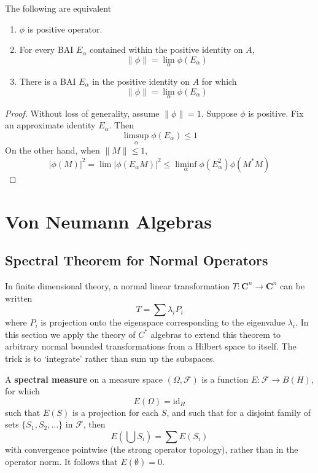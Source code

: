 \begin{theorem}
    The following are equivalent
    \begin{enumerate}
        \item $\phi$ is positive operator.
        \item For every BAI $E_\alpha$ contained within the positive identity on $A$,
        \[ \| \phi \| = \lim_\alpha \phi(E_\alpha) \]
        \item There is a BAI $E_\alpha$ in the positive identity on $A$ for which
        \[ \| \phi \| = \lim_\alpha \phi(E_\alpha) \]
    \end{enumerate}
\end{theorem}
\begin{proof}
    Without loss of generality, assume $\| \phi \| = 1$. Suppose $\phi$ is positive. Fix an approximate identity $E_\alpha$. Then
    \[ \limsup_\alpha \phi(E_\alpha) \leq 1 \]
    On the other hand, when $\| M \| \leq 1$,
    \[ |\phi(M)|^2 = \lim |\phi(E_\alpha M)|^2 \leq \liminf_\alpha \phi(E_\alpha^2) \phi(M^*M) \]
\end{proof}




\chapter{Von Neumann Algebras}





\section{Spectral Theorem for Normal Operators}

In finite dimensional theory, a normal linear transformation $T: \mathbf{C}^n \to \mathbf{C}^n$ can be written
%
\[ T = \sum \lambda_i P_i \]
%
where $P_i$ is projection onto the eigenspace corresponding to the eigenvalue $\lambda_i$. In this section we apply the theory of $C^*$ algebras to extend this theorem to arbitrary normal bounded transformations from a Hilbert space to itself. The trick is to `integrate' rather than sum up the subspaces.

A {\bf spectral measure} on a measure space $(\Omega, \mathcal{F})$ is a function $E: \mathcal{F} \to B(H)$, for which
%
\[ E(\Omega) = \text{id}_H \]
%
such that $E(S)$ is a projection for each $S$, and such that for a disjoint family of sets $\{ S_1, S_2, \dots \}$ in $\mathcal{F}$, then
%
\[ E \left( \bigcup S_i \right) = \sum E(S_i) \]
%
with convergence pointwise (the strong operator topology), rather than in the operator norm. It follows that $E(\emptyset) = 0$.

